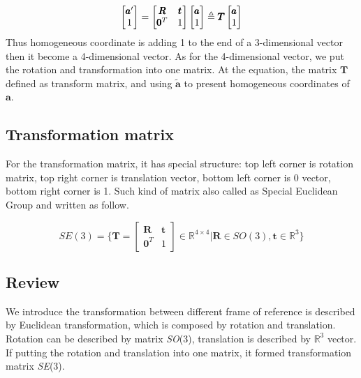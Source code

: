 \begin{equation}
    \begin{bmatrix} 
        \pmb{a}' \\
        1
    \end{bmatrix}=
    \begin{bmatrix}
        \pmb{R} & \pmb{t}\\
        \pmb{0}^T & 1
    \end{bmatrix}
    \begin{bmatrix}
        \pmb{a}\\
        1
    \end{bmatrix}
    \triangleq
    \pmb{T}\\
    \begin{bmatrix}
        \pmb{a}\\
        1
    \end{bmatrix}
\end{equation}
Thus homogeneous coordinate is adding 1 to the end of a 3-dimensional vector then it become a 4-dimensional vector. As for the 4-dimensional vector, we put the rotation and transformation into one matrix. At the equation, the matrix $\pmb{T}$ defined as transform matrix, and using $\pmb{\tilde{a}}$ to present homogeneous coordinates of $\pmb{a}$.

\subsection{Transformation matrix}

For the transformation matrix, it has special structure: top left corner is rotation matrix, top right corner is translation vector, bottom left corner is 0 vector, bottom right corner is 1. Such kind of matrix also called as Special Euclidean Group and written as follow.

\begin{equation}
    SE(3)=\{\pmb{T} = 
    \begin{bmatrix} 
        \pmb{R} & \pmb{t}\\
        \pmb{0}^T & 1
    \end{bmatrix} \in \mathbb{R}^{4\times4}|\pmb{R} \in SO(3),\pmb{t}
    \in \mathbb{R}^3\}
\end{equation}

\subsection{Review}

We introduce the transformation between different frame of reference is described by Euclidean transformation, which is composed by rotation and translation. Rotation can be described by matrix \emph{SO}(3), translation is described by $\mathbb{R}^3$ vector. If putting the rotation and translation into one matrix, it formed transformation matrix \emph{SE}(3).
